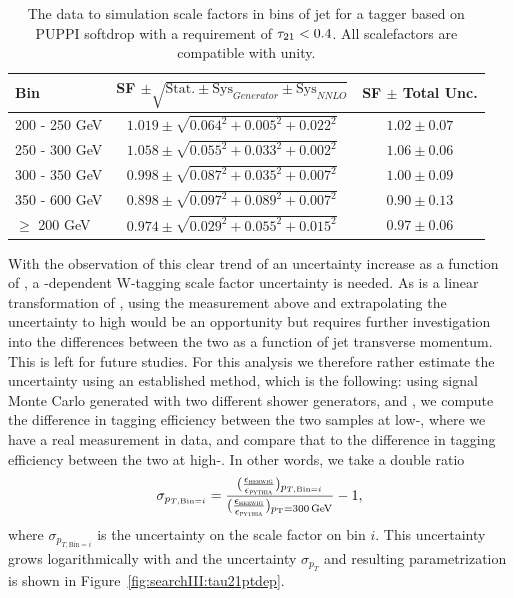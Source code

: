 \begin{table}[h!]
    \centering
    \begin{tabular}{|l|c|c|}
    \hline
     Bin & SF $\pm \sqrt{\textrm{Stat.} \pm \textrm{Sys}_{Generator} \pm \textrm{Sys}_{NNLO}}$ & SF $\pm$ Total Unc. \\
\hline
200 - 250 GeV  & $1.019  \pm \sqrt{ 0.064^2 + 0.005^2 + 0.022^2 }$ & $1.02 \pm 0.07$\\
250 - 300 GeV  & $1.058  \pm \sqrt{ 0.055^2 + 0.033^2 + 0.002^2 }$ & $1.06 \pm 0.06$\\
300 - 350 GeV  & $0.998  \pm \sqrt{ 0.087^2 + 0.035^2 + 0.007^2 }$ & $1.00 \pm 0.09$\\
350 - 600 GeV  & $0.898  \pm \sqrt{ 0.097^2 + 0.089^2 + 0.007^2 }$ & $0.90 \pm 0.13$\\
\hline
$\geq$ 200 GeV & $0.974  \pm \sqrt{ 0.029^2 + 0.055^2 + 0.015^2 }$ & $0.97 \pm 0.06$\\
    \hline
    \end{tabular}
    \caption{The data to simulation scale factors in bins of jet \PT for a tagger based on PUPPI softdrop with a requirement of $\tau_{21}<0.4$. All scalefactors are compatible with unity.}
    \label{tab:searchIII:sfptdep}
 \end{table}
With the observation of this clear trend of an uncertainty increase as a function of \PT, a \PT-dependent W-tagging scale factor uncertainty is needed. As \ddt is a linear transformation of \nsubj, using the measurement above and extrapolating the uncertainty to high \PT would be an opportunity but requires further investigation into the differences between the two as a function of jet transverse momentum. This is left for future studies. For this analysis we therefore rather estimate the uncertainty using an established method, which is the following: using signal Monte Carlo generated with two different shower generators,  and \HERWIG{++}, we compute the difference in tagging efficiency between the two samples at low-\PT, where we have a real measurement in data, and compare that to the difference in tagging efficiency between the two at high-\PT. In other words, we take a double ratio 
\begin{equation}
  \sigma_{p_{T,\textrm{Bin}=i}}=\frac{ (\frac{\epsilon_{{\textsc{herwig}}}}{\epsilon_{{\textsc{pythia}}}})_{p_{T,\textrm{Bin}=i}}} {(\frac{\epsilon_{{\textsc{herwig}}}}{\epsilon_{{\textsc{pythia}}}})_{p_{\mathrm{T}}=300 \,\text{Ge\hspace{-.08em}V}}}-1,
  \end{equation}
where $\sigma_{p_{T,\textrm{Bin}=i}}$ is the uncertainty on the scale factor on \PT bin $i$. This uncertainty grows logarithmically with \PT and the uncertainty $\sigma_{p_{T}}$ and resulting parametrization is shown in Figure~\ref{fig:searchIII:tau21ptdep}.
